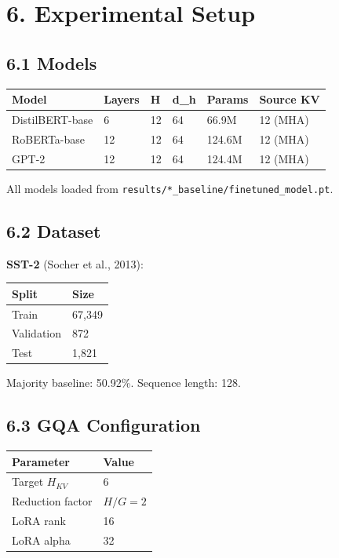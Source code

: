 
\section{6. Experimental Setup}

\subsection{6.1 Models}

\begin{table}[H]
\centering
\small
\begin{tabular}{llllll}
\toprule
\textbf{Model} & \textbf{Layers} & \textbf{H} & \textbf{d\_h} & \textbf{Params} & \textbf{Source KV} \\
\midrule
DistilBERT-base & 6 & 12 & 64 & 66.9M & 12 (MHA) \\
RoBERTa-base & 12 & 12 & 64 & 124.6M & 12 (MHA) \\
GPT-2 & 12 & 12 & 64 & 124.4M & 12 (MHA) \\
\bottomrule
\end{tabular}
\end{table}

All models loaded from \texttt{results/*\_baseline/finetuned\_model.pt}.

\subsection{6.2 Dataset}

\textbf{SST-2} (Socher et al., 2013):

\begin{table}[H]
\centering
\small
\begin{tabular}{ll}
\toprule
\textbf{Split} & \textbf{Size} \\
\midrule
Train & 67,349 \\
Validation & 872 \\
Test & 1,821 \\
\bottomrule
\end{tabular}
\end{table}

Majority baseline: 50.92\%. Sequence length: 128.

\subsection{6.3 GQA Configuration}

\begin{table}[H]
\centering
\small
\begin{tabular}{ll}
\toprule
\textbf{Parameter} & \textbf{Value} \\
\midrule
Target $H_{KV}$ & 6 \\
Reduction factor & $H / G = 2$ \\
LoRA rank & 16 \\
LoRA alpha & 32 \\
\bottomrule
\end{tabular}
\end{table}

